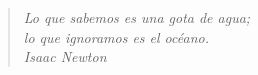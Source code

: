 \indent

\vfill

\begin{quote}
\begin{flushright}
	\textit{Lo que sabemos es una gota de agua;}\\
	\textit{lo que ignoramos es el océano.}\\
	\textit{Isaac Newton}
\end{flushright}



\end{quote}

\vfill
\cleardoublepage

\pagestyle{plain}
